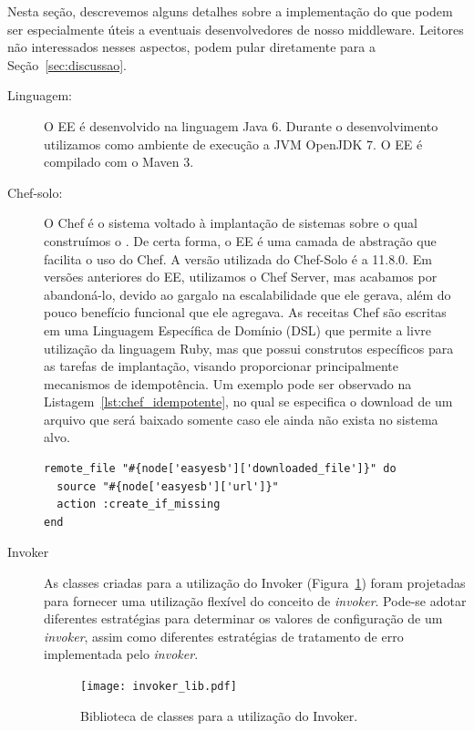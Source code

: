 Nesta seção, descrevemos alguns detalhes sobre a implementação do \ee que 
podem ser especialmente úteis a eventuais desenvolvedores de nosso middleware.
Leitores não interessados nesses aspectos, podem pular diretamente para a Seção~\ref{sec:discussao}.

\begin{description}

\item [Linguagem:] 

O EE é desenvolvido na linguagem Java 6. 
Durante o desenvolvimento utilizamos como ambiente de execução
a JVM OpenJDK 7. O EE é compilado com o Maven 3.

\item [Chef-solo:] 

O Chef é o sistema voltado à implantação de sistemas sobre o qual construímos o \ee.
De certa forma, o EE é uma camada de abstração que facilita o uso do Chef.
A versão utilizada do Chef-Solo é a 11.8.0.
Em versões anteriores do EE, utilizamos o Chef Server,
mas acabamos por abandoná-lo, devido ao gargalo na escalabilidade
que ele gerava, além do pouco benefício funcional que ele agregava.
As receitas Chef são escritas em uma Linguagem Específica de Domínio (DSL) 
que permite a livre
utilização da linguagem Ruby, mas que possui construtos
específicos para as tarefas de implantação, visando proporcionar
principalmente mecanismos de idempotência. Um exemplo pode ser
observado na Listagem~\ref{lst:chef_idempotente}, no qual
se especifica o download de um arquivo que será
baixado somente caso ele ainda não exista no sistema alvo.

\begin{lstlisting}[frame=trbl, label=lst:chef_idempotente, caption=Trecho de receita Chef que ilustra uso de idempotência.]
remote_file "#{node['easyesb']['downloaded_file']}" do
  source "#{node['easyesb']['url']}"
  action :create_if_missing
end
\end{lstlisting}

\item [Invoker]

As classes criadas para a utilização do \textsf{Invoker} (Figura~\ref{fig:invoker_lib})
foram projetadas para fornecer uma utilização flexível
do conceito de \emph{invoker}.
Pode-se adotar diferentes estratégias para determinar os
valores de configuração de um \emph{invoker},
assim como diferentes estratégias de tratamento de erro
implementada pelo \emph{invoker}.

\begin{figure}[ht]
\centering
\texttt{[image: invoker\_lib.pdf]}
\caption{Biblioteca de classes para a utilização do Invoker.}
\label{fig:invoker_lib}
\end{figure}


\end{description}
